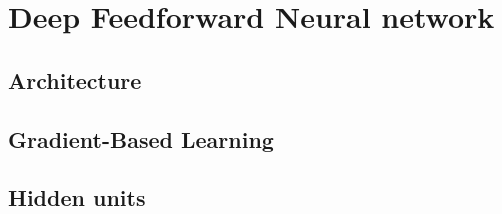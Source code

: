 \chapter{Deep Feedforward Neural network}

\section{Architecture}

\section{Gradient-Based Learning}

\section{Hidden units}